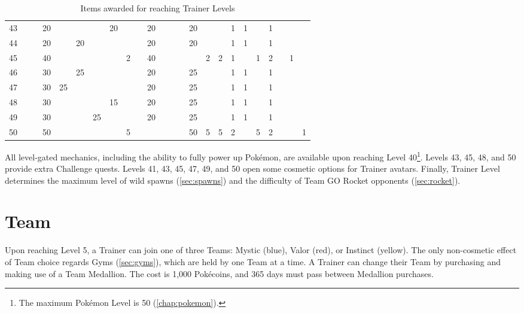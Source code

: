 \begin{table}[t]
\begin{center}
\begin{tabular}{r|g c g c g c g c g c g c g c g c g c g c g c g}
   43 &    &    & 20 &    &    &    & 20 &   &    & 20 &    &    &    & 20 &   &   & 1  & 1 &   & 1 &   &   &   \\
   44 &    &    & 20 &    & 20 &    &    &   &    & 20 &    &    &    & 20 &   &   & 1  & 1 &   & 1 &   &   &   \\
   45 &    &    & 40 &    &    &    &    & 2 &    & 40 &    &    &    &    & 2 & 2 & 1  &   & 1 & 2 &   & 1 &   \\
   46 &    &    & 30 &    & 25 &    &    &   &    & 20 &    &    &    & 25 &   &   & 1  & 1 &   & 1 &   &   &   \\
   47 &    &    & 30 & 25 &    &    &    &   &    & 20 &    &    &    & 25 &   &   & 1  & 1 &   & 1 &   &   &   \\
   48 &    &    & 30 &    &    &    & 15 &   &    & 20 &    &    &    & 25 &   &   & 1  & 1 &   & 1 &   &   &   \\
   49 &    &    & 30 &    &    & 25 &    &   &    & 20 &    &    &    & 25 &   &   & 1  & 1 &   & 1 &   &   &   \\
   50 &    &    & 50 &    &    &    &    & 5 &    &    &    &    &    & 50 & 5 & 5 & 2  &   & 5 & 2 &   &   & 1 \\
\end{tabular}
\caption{Items awarded for reaching Trainer Levels}
\label{table:levelitems}
\end{center}
\end{table}

All level-gated mechanics, including the ability to fully power up Pokémon,
 are available upon reaching Level 40\footnote{The maximum Pokémon Level is 50 (\autoref{chap:pokemon}).}.
Levels 43, 45, 48, and 50 provide extra Challenge quests.
Levels 41, 43, 45, 47, 49, and 50 open some cosmetic options for Trainer avatars.
Finally, Trainer Level determines the maximum level of wild spawns
  (\autoref{sec:spawns}) and the difficulty of Team GO Rocket
  opponents (\autoref{sec:rocket}).

\section{Team}
Upon reaching Level 5, a Trainer can join one of three Teams: Mystic (blue),
  Valor (red), or Instinct (yellow).
The only non-cosmetic effect of Team choice regards Gyms (\autoref{sec:gyms}), which
  are held by one Team at a time.
A Trainer can change their Team by purchasing and making use of a Team Medallion.
The cost is 1,000 Pokécoins, and 365 days must pass between Medallion purchases.

